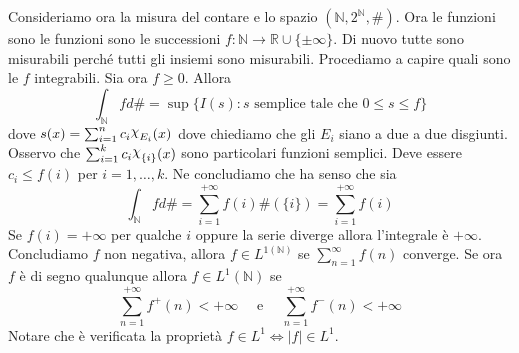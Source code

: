 \begin{example}
    Consideriamo ora la misura del contare e lo spazio \((\mathbb{N},
    2^{\mathbb{N}}, \#)\). Ora le funzioni sono le funzioni sono le successioni
    \(f : \mathbb{N} \to \mathbb{R} \cup \{\pm \infty\} \). Di nuovo tutte sono
    misurabili perché tutti gli insiemi sono misurabili. Procediamo a capire
    quali sono le \(f\) integrabili. Sia ora \(f \ge 0\).
    Allora
    \[
        \int_{\mathbb{N}} f d\# = \sup \{ I(s) : s \text{ semplice tale che } 0
        \le s \le f\}
    \]
    dove \(s(x) = \sum_{i=1}^{n} c_{i} \rchi_{E_{i}}(x) \) dove chiediamo che gli
    \(E_{i}\) siano a due a due disgiunti. Osservo che \(\sum_{i=1}^{k} c_{i}
    \rchi_{\{i\} } (x) \) sono particolari funzioni semplici. Deve essere
    \(c_{i} \le f(i)\) per \(i = 1, \dots, k\).
    Ne concludiamo che ha senso che sia
    \[
        \int_{\mathbb{N}} f d\# = \sum_{i=1}^{+\infty} f(i) \#(\{i\} ) =
        \sum_{i=1}^{+\infty} f(i)
    \]
    Se \(f(i) = +\infty\) per qualche \(i\) oppure la serie diverge allora
    l'integrale è \(+\infty\).
    Concludiamo \(f\) non negativa, allora \(f \in L^{1(\mathbb{N})}\) se
    \(\sum_{n=1}^{\infty} f(n) \) converge. Se ora \(f\) è di segno qualunque
    allora \(f \in  L^{1}(\mathbb{N})\) se 
    \[
        \sum_{n=1}^{+\infty} f^{+}(n) < +\infty \quad \text{ e } \quad
        \sum_{n=1}^{+\infty} f^{-}(n) < +\infty
    \]
    Notare che è verificata la proprietà \(f \in L^{1} \iff |f| \in L^{1}\).
\end{example}


